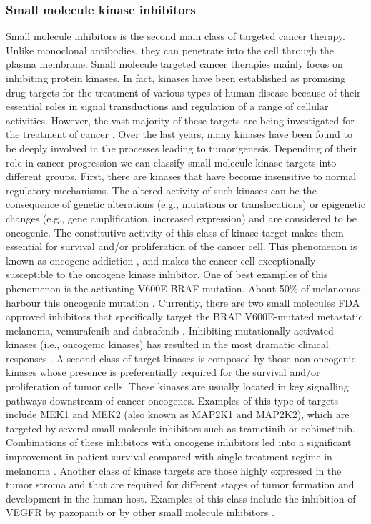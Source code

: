 \documentclass[11pt, b5paper,twoside]{tesi_upf}
\begin{document}
\subsubsection{Small molecule kinase inhibitors}\label{kinases}

\par Small molecule inhibitors is the second main class of targeted cancer therapy.  Unlike monoclonal antibodies, they can penetrate into the cell through the plasma membrane. Small molecule targeted cancer therapies mainly focus on inhibiting protein kinases. In fact, kinases have been established as promising drug targets for the treatment of various types of human disease because of their essential roles in signal transductions and regulation of a range of cellular activities. However, the vast majority of these targets are being investigated for the treatment of cancer \cite{Zhang2009}.  Over the last years,  many kinases have been found to be deeply involved in the processes leading to tumorigenesis. Depending of their role in cancer progression we can classify small molecule kinase targets into different groups.  First, there are kinases that have become insensitive to normal regulatory mechanisms. The altered activity of such kinases can be the consequence of genetic alterations (e.g., mutations or translocations) or epigenetic changes (e.g., gene amplification, increased expression) and are considered to be oncogenic. The constitutive activity of this class of kinase target makes them essential for survival and/or proliferation of the cancer cell. This phenomenon is known as oncogene addiction \cite{Weinstein2006}, and makes the cancer cell exceptionally susceptible to the oncogene kinase inhibitor. One of best examples of this phenomenon is the activating V600E BRAF mutation. About 50$\%$ of melanomas harbour this oncogenic mutation \cite{Ascierto2012}. Currently, there are two small molecules FDA approved inhibitors that specifically target the BRAF V600E-mutated metastatic melanoma, vemurafenib \cite{Bollag2010} and dabrafenib \cite{Gibney2013}. Inhibiting mutationally activated kinases (i.e., oncogenic kinases) has resulted in the most dramatic clinical responses \cite{Zhang2009}.  A second class of target kinases is composed by those non-oncogenic kinases whose presence is preferentially required for the survival and/or proliferation of tumor cells.  These kinases are usually located in key signalling pathways downstream of cancer oncogenes. Examples of this type of targets include MEK1 and MEK2 (also known as MAP2K1 and MAP2K2), which are targeted by several small molecule inhibitors such as trametinib or cobimetinib. Combinations of these inhibitors with oncogene inhibitors led into a significant improvement in patient survival compared with single treatment regime in melanoma \cite{Flaherty2012, Flaherty2012a}. Another class of kinase targets are those highly expressed in the tumor stroma and that are required for different stages of tumor formation and development in the human host. Examples of this class include the inhibition of VEGFR by pazopanib or by other small molecule inhibitors \cite{Ivy2009}.
 
\end{document}
